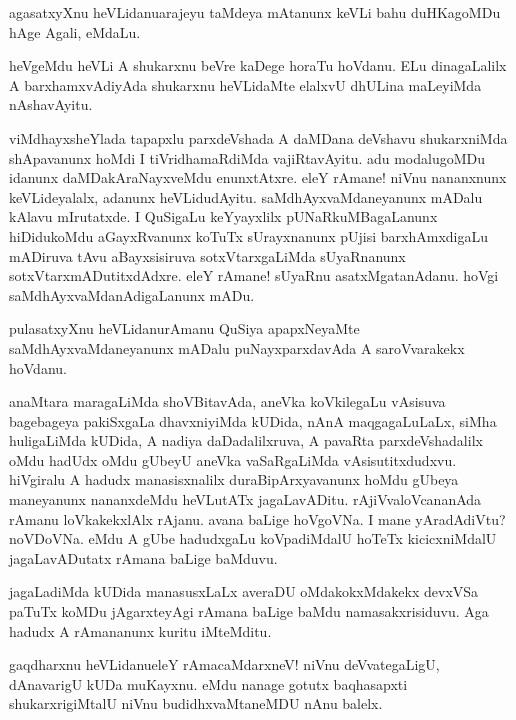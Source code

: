 \begin{mng}
agasatxyXnu heVLidanu\mdash arajeyu taMdeya mAtanunx keVLi bahu duHKagoMDu hAge Agali, eMdaLu.
\end{mng}

\begin{mng}
heVgeMdu heVLi A shukarxnu beVre kaDege horaTu hoVdanu. ELu dinagaLalilx A barxhamxvAdiyAda shukarxnu heVLidaMte elalxvU dhULina maLeyiMda nAshavAyitu.
\end{mng}

\begin{mng}
viMdhayxsheYlada tapapxlu parxdeVshada A daMDana deVshavu shukarxniMda shApavanunx hoMdi I tiVridhamaRdiMda vajiRtavAyitu. adu modalugoMDu idanunx daMDakAraNayxveMdu enunxtAtxre. eleY rAmane! niVnu nananxnunx keVLideyalalx, adanunx heVLidudAyitu. saMdhAyxvaMdaneyanunx mADalu kAlavu mIrutatxde. I QuSigaLu keYyayxlilx pUNaRkuMBagaLanunx hiDidukoMdu aGayxRvanunx koTuTx sUrayxnanunx pUjisi barxhAmxdigaLu mADiruva tAvu aBayxsisiruva sotxVtarxgaLiMda sUyaRnanunx sotxVtarxmADutitxdAdxre. eleY rAmane! sUyaRnu asatxMgatanAdanu. hoVgi saMdhAyxvaMdanAdigaLanunx mADu.
\end{mng}

\begin{mng}
pulasatxyXnu heVLidanu\mdash rAmanu QuSiya apapxNeyaMte saMdhAyxvaMdaneyanunx mADalu puNayxparxdavAda A saroVvarakekx hoVdanu.
\end{mng}

\begin{mng}
anaMtara maragaLiMda shoVBitavAda, aneVka koVkilegaLu vAsisuva bagebageya pakiSxgaLa dhavxniyiMda kUDida, nAnA maqgagaLuLaLx, siMha huligaLiMda kUDida, A nadiya daDadalilxruva, A pavaRta parxdeVshadalilx oMdu hadUdx oMdu gUbeyU aneVka vaSaRgaLiMda vAsisutitxdudxvu. hiVgiralu A hadudx manasisxnalilx duraBipArxyavanunx hoMdu gUbeya maneyanunx nananxdeMdu heVLutATx jagaLavADitu. rAjiVvaloVcananAda rAmanu loVkakekxlAlx rAjanu. avana baLige hoVgoVNa. I mane yAradAdiVtu? noVDoVNa. eMdu A gUbe hadudxgaLu koVpadiMdalU hoTeTx kicicxniMdalU jagaLavADutatx rAmana baLige baMduvu.
\end{mng}

\begin{mng}
jagaLadiMda kUDida manasusxLaLx averaDU oMdakokxMdakekx devxVSa paTuTx koMDu jAgarxteyAgi rAmana baLige baMdu namasakxrisiduvu. Aga hadudx A rAmananunx kuritu iMteMditu.
\end{mng}

\begin{mng}
gaqdharxnu heVLidanu\mdash eleY rAmacaMdarxneV! niVnu deVvategaLigU, dAnavarigU kUDa muKayxnu. eMdu nanage gotutx baqhasapxti shukarxrigiMtalU niVnu budidhxvaMtaneMDU nAnu balelx.
\end{mng}

